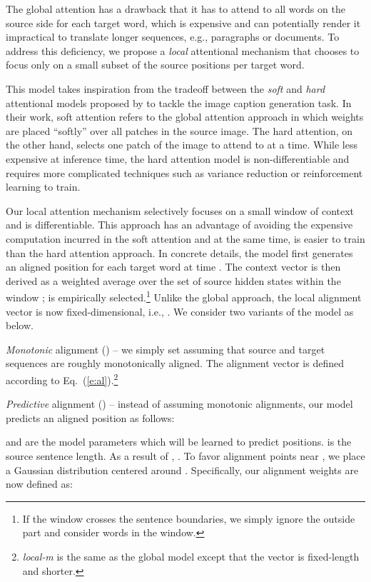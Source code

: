 \documentclass[11pt,a4paper]{article}
\newcommand{\eq}[1]{Eq.~(\ref{#1})}
\newcommand{\edit}[1]{{#1}} \newcommand{\hide}[1]{}
\begin{document}
The global attention has a drawback that it has to attend to all words on the
source side for each target word, which is expensive and can potentially render it impractical to
translate longer sequences, e.g., paragraphs or documents.
To address this deficiency, we propose a {\it local} attentional mechanism that
chooses to focus only on a small subset of the source positions per target word.

This model takes inspiration from the tradeoff between the {\it soft} and {\it
hard} attentional models proposed by  to tackle the image caption
generation task. In their work, soft attention refers to the global attention
approach in which weights are placed ``softly'' over all patches in the source
image. The hard attention, on the other hand, selects one patch
of the image to attend to at a time. While less expensive at inference time, the
hard attention model is non-differentiable and requires more complicated
techniques such as variance reduction or reinforcement learning to train.

Our local attention mechanism selectively focuses on a small window of
context and is differentiable. This approach has an advantage of avoiding the expensive computation incurred in
the soft attention and at the same time, is easier to train than the hard
attention approach.
In concrete details, the model first generates an aligned position  for each target word at time . The
context vector  is then derived as a weighted average over the set of source hidden states within the window ;  is
empirically selected.\footnote{If the window crosses the sentence boundaries, we
simply ignore the outside part and consider words in the window.} Unlike the global approach, the local alignment vector  is now fixed-dimensional, i.e., . We consider two variants of the model as below.

\textit{Monotonic} alignment ({\bf \localm{}}) -- we simply set  assuming that source and target sequences are roughly
monotonically aligned. The alignment vector  is defined according to
\eq{e:al}.\footnote{\edit{{\it local-m} is the same as
the global model except that the vector  is
fixed-length and shorter.}} 

\textit{Predictive} alignment ({\bf \localp{}}) --  instead of assuming monotonic alignments, our model predicts an aligned position as follows:

 and  are the model parameters which will be learned
to predict positions.  is the source sentence length. As a result of , . To favor alignment points near , we place a Gaussian distribution centered around  . Specifically, our alignment weights are now
defined as:
\end{document}
